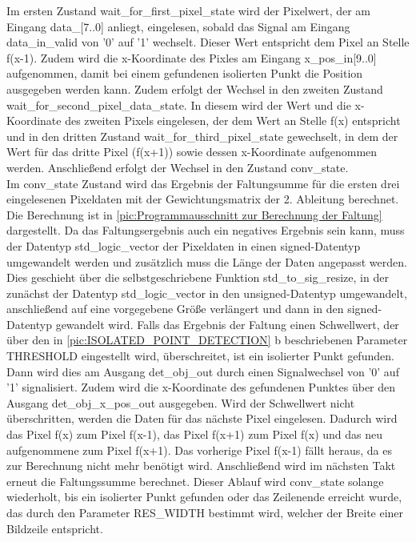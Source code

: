 \documentclass[ngerman,12pt]{article} %
\begin{document}
{Im ersten Zustand wait\_for\_first\_pixel\_state wird der Pixelwert, der am Eingang data\_[7..0] anliegt, eingelesen, sobald das Signal am Eingang data\_in\_valid von '0' auf '1' wechselt. Dieser Wert entspricht dem Pixel an Stelle f(x-1). Zudem wird die x-Koordinate des Pixles am Eingang x\_pos\_in[9..0] aufgenommen, damit bei einem gefundenen isolierten Punkt die Position ausgegeben werden kann. Zudem erfolgt der Wechsel in den zweiten Zustand wait\_for\_second\_pixel\_data\_state. In diesem wird der Wert und die x-Koordinate des zweiten Pixels eingelesen, der dem Wert an Stelle f(x) entspricht und in den dritten Zustand wait\_for\_third\_pixel\_state gewechselt, in dem der Wert für das dritte Pixel (f(x+1)) sowie dessen x-Koordinate aufgenommen werden. Anschließend erfolgt der Wechsel in den Zustand conv\_state.\\
Im conv\_state Zustand wird das Ergebnis der Faltungsumme für die ersten drei eingelesenen Pixeldaten mit der Gewichtungsmatrix der 2. Ableitung berechnet. Die Berechnung ist in \autoref{pic:Programmausschnitt zur Berechnung der Faltung} dargestellt. Da das Faltungsergebnis auch ein negatives Ergebnis sein kann, muss der Datentyp std\_logic\_vector der Pixeldaten in einen signed-Datentyp umgewandelt werden und zusätzlich muss die Länge der Daten angepasst werden. Dies geschieht über die selbstgeschriebene Funktion std\_to\_sig\_resize, in der zunächst der Datentyp std\_logic\_vector in den unsigned-Datentyp umgewandelt, anschließend auf eine vorgegebene Größe verlängert und dann in den signed-Datentyp gewandelt wird. Falls das Ergebnis der Faltung einen Schwellwert, der über den in \autoref{pic:ISOLATED_POINT_DETECTION} b beschriebenen Parameter THRESHOLD eingestellt wird, überschreitet, ist ein isolierter Punkt gefunden. Dann wird dies am Ausgang det\_obj\_out durch einen Signalwechsel von '0' auf '1' signalisiert. Zudem wird die x-Koordinate des gefundenen Punktes über den Ausgang det\_obj\_x\_pos\_out ausgegeben. Wird der Schwellwert nicht überschritten, werden die Daten für das nächste Pixel eingelesen. Dadurch wird das Pixel f(x) zum Pixel f(x-1), das Pixel f(x+1) zum Pixel f(x) und das neu aufgenommene zum Pixel f(x+1). Das vorherige Pixel f(x-1) fällt heraus, da es zur Berechnung nicht mehr benötigt wird. Anschließend wird im nächsten Takt erneut die Faltungssumme berechnet. Dieser Ablauf wird conv\_state solange wiederholt, bis ein isolierter Punkt gefunden oder das Zeilenende erreicht wurde, das durch den Parameter RES\_WIDTH bestimmt wird, welcher der Breite einer Bildzeile entspricht.\newline

}
\end{document}
